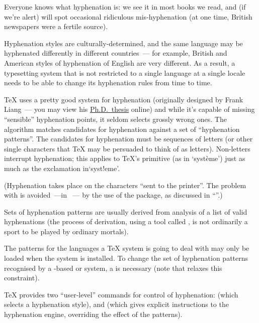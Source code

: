 
Everyone knows what hyphenation is: we see it in most books we read,
and (if we're alert) will spot occasional ridiculous mis-hyphenation
(at one time, British newspapers were a fertile source).

Hyphenation styles are culturally-determined, and the same language
may be hyphenated differently in different countries~--- for example,
British and American styles of hyphenation of English are very
different.  As a result, a typesetting system that is not restricted
to a single language at a single locale needs to be able to change its
hyphenation rules from time to time.

\TeX{} uses a pretty good system for hyphenation (originally designed
by Frank Liang~--- you may view his %
\href{http://tug.org/docs/liang/}{Ph.D.\ thesis} online) and while
it's capable of missing ``sensible'' hyphenation points, it seldom
selects grossly wrong ones.  The
algorithm matches candidates for hyphenation against a set of
``hyphenation patterns''.  The candidates for hyphenation must be
sequences of letters (or other single characters that \TeX{} may be
persuaded to think of as letters).  Non-letters interrupt hyphenation;
this applies to \TeX{}'s  primitive (as in `syst\`eme')
just as much as the exclamation in`syst!eme'.

(Hyphenation takes place on the characters ``sent to the printer''.
The problem with  is avoided~---in \latex{}~--- by the use
of the  package, as discussed in %
``''.)

Sets of hyphenation patterns are usually derived from analysis of
a list of valid hyphenations (the process of derivation, using a tool
called , is not ordinarily a sport to be played by
ordinary mortals).

The patterns for the languages a \TeX{} system is going to deal with
may only be loaded when the system is installed.  To change the set of
hyphenation patterns recognised by a \tex{}-based or \xetex{} system,
a  is necessary (note that 
 relaxes this constraint).

\TeX{} provides two ``user-level'' commands for control of
hyphenation:  (which selects a hyphenation style), and
 (which gives explicit instructions to the hyphenation
engine, overriding the effect of the patterns).

